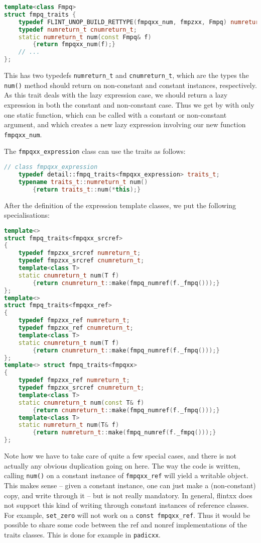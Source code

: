 \documentclass[a4paper,10pt]{book}
\newcommand{\code}{\lstinline}
\begin{document}
{{\begin{lstlisting}[language=c++]
template<class Fmpq>
struct fmpq_traits {
    typedef FLINT_UNOP_BUILD_RETTYPE(fmpqxx_num, fmpzxx, Fmpq) numreturn_t;
    typedef numreturn_t cnumreturn_t;
    static numreturn_t num(const Fmpq& f)
        {return fmpqxx_num(f);}
    // ...
};
\end{lstlisting}

This has two typedefs \code{numreturn_t} and \code{cnumreturn_t}, which are the
types the \code{num()} method should return on non-constant and constant
instances, respectively. As this trait deals with the lazy expression case, we
should return a lazy expression in both the constant and non-constant case. Thus
we get by with only one static function, which can be called with a constant or
non-constant argument, and which creates a new lazy expression involving our new
function \code{fmpqxx_num}.

The \code{fmpqxx_expression} class can use the traits as follows:

\begin{lstlisting}[language=c++]
// class fmpqxx_expression
    typedef detail::fmpq_traits<fmpqxx_expression> traits_t;
    typename traits_t::numreturn_t num()
        {return traits_t::num(*this);}
\end{lstlisting}

After the definition of the expression template classes, we put the following
specialisations:

\begin{lstlisting}[language=c++]
template<>
struct fmpq_traits<fmpqxx_srcref>
{
    typedef fmpzxx_srcref numreturn_t;
    typedef fmpzxx_srcref cnumreturn_t;
    template<class T>
    static cnumreturn_t num(T f)
        {return cnumreturn_t::make(fmpq_numref(f._fmpq()));}
};
template<>
struct fmpq_traits<fmpqxx_ref>
{
    typedef fmpzxx_ref numreturn_t;
    typedef fmpzxx_ref cnumreturn_t;
    template<class T>
    static cnumreturn_t num(T f)
        {return cnumreturn_t::make(fmpq_numref(f._fmpq()));}
};
template<> struct fmpq_traits<fmpqxx>
{
    typedef fmpzxx_ref numreturn_t;
    typedef fmpzxx_srcref cnumreturn_t;
    template<class T>
    static cnumreturn_t num(const T& f)
        {return cnumreturn_t::make(fmpq_numref(f._fmpq()));}
    template<class T>
    static numreturn_t num(T& f)
        {return numreturn_t::make(fmpq_numref(f._fmpq()));}
};
\end{lstlisting}

Note how we have to take care of quite a few special cases, and there is not
actually any obvious duplication going on here. The way the code is written,
calling \code{num()} on a constant instance of \code{fmpqxx_ref} will yield a
writable object. This makes sense -- given a constant instance, one can just
make a (non-constant) copy, and write through it -- but is not really mandatory.
In
general, flintxx does not support this kind of writing through constant
instances of reference classes.
For example, \code{set_zero} will not work on a \code{const fmpqxx_ref}.
Thus it would be possible to share some code between the ref and
nonref implementations of the traits classes. This is done for example in
\code{padicxx}.

}}
\end{document}
